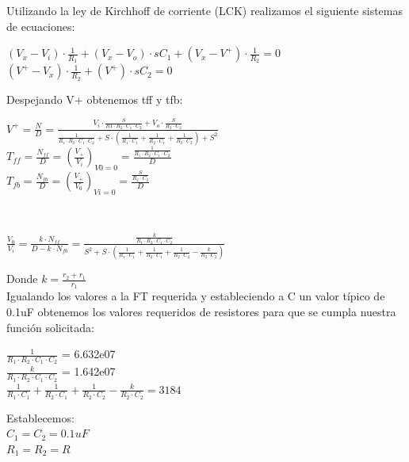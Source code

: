 \hspace{1mm} Utilizando la ley de Kirchhoff de corriente (LCK) realizamos el siguiente sistemas de ecuaciones:
\begin{center}
	$(V_x - V_i) \cdot \frac{1}{R_1} + (V_x - V_o) \cdot sC_1 + (V_x - V^+) \cdot \frac{1}{R_2} = 0$ \\
	$(V^+ - V_x) \cdot \frac{1}{R_2} + (V^+) \cdot sC_2 = 0 $\\
\end{center}
\hspace{1mm} Despejando V+ obtenemos tff y tfb:

\begin{center}
$V^+ = \frac{N}{D} = \frac{V_i \cdot \frac{S}{R1\cdot R_2 \cdot C_1\cdot C_2} + V_o \cdot \frac{S}{R_2 \cdot C_2}}{\frac{1}{R_1 \cdot R_2 \cdot C_1 \cdot C_2} + S \cdot (\frac{1}{R_1 \cdot C_1}+ \frac{1}{R_2 \cdot C_1}+ \frac{1}{R_2 \cdot C_2})+ S^2}$ \\

$T_{ff} = \frac{N_{ff}}{D} = (\frac{V_+}{V_i})_{V0=0} = \frac{\frac{1}{R_1 \cdot R_2 \cdot C_1 \cdot C_2 }}{D}$ \\ 
$T_{fb} = \frac{N_{fb}}{D} = (\frac{V_+}{V_0})_{Vi=0} = \frac{\frac{S}{R_2 \cdot C_2 }}{D}$ \\
\end{center}
 \\
\begin{center}
$\frac{V_0}{V_i} = \frac{k \cdot N_{ff}}{D - k \cdot N_{fb}} =  \frac{\frac{k}{R_1 \cdot R_2 \cdot C_1 \cdot C_2}}{S^2+S \cdot \left(\frac{1}{R_1 \cdot C_1} + \frac{1}{R_2 \cdot C_1} + \frac{1}{R_2 \cdot C_2} - \frac{k}{R_2 \cdot C_2}\right) }$

\end{center}
Donde $k = \frac{r_2+r_1}{r_1}$ \\
\hspace{1mm} Igualando los valores a la FT requerida y estableciendo a C un valor típico de 0.1uF obtenemos los valores requeridos de resistores para que se cumpla nuestra función solicitada: \\
 \begin{center}
 $\frac{1}{R_1 \cdot R_2 \cdot C_1 \cdot C_2}$ = 6.632e07 \\
 $\frac{k}{R_1 \cdot R_2 \cdot C_1 \cdot C_2}$ = 1.642e07 \\
 $\frac{1}{R_1 \cdot C_1} + \frac{1}{R_2 \cdot C_1} + \frac{1}{R_2 \cdot C_2} - \frac{k}{R_2 \cdot C_2} = 3184 $ 
\end{center}
\begin{flushleft}
	Establecemos: \\
	$ C_1 = C_2 = 0.1 uF $\\
	$ R_1 = R_2 = R $ \\
\end{flushleft} 

